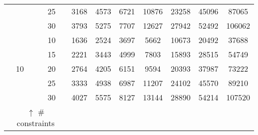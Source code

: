 \begin{table}[]
{\begin{tabular}{|c|c|ccccccc|}
&25                                                           & 3168 & 4573 & 6721 & 10876 & 23258 & 45096 & 87065  \\
&30                                                           & 3793 & 5275 & 7707 & 12627 & 27942 & 52492 & 106062  \\
\hline
\hline
\multirow{5}{*}{10}&10                                                           & 1636 & 2524 & 3697 & 5662 & 10673 & 20492 & 37688 \\
&15                                                           & 2221 & 3443 & 4999 & 7803 & 15893 & 28515 & 54749  \\
&20                                                           & 2764 & 4205 & 6151 & 9594 & 20393 & 37987 & 73222  \\
&25                                                           & 3333 & 4938 & 6987 & 11207 & 24102 & 45570 & 89210  \\
&30                                                           & 4027 & 5575 & 8127 & 13144 & 28890 & 54214 & 107520  \\
\hline 
\hline
\multicolumn{2}{|c}{ $\uparrow$ \# constraints}  &  &  &  &  &  &  &   \\
\hline
\end{tabular}
}
\end{table}

